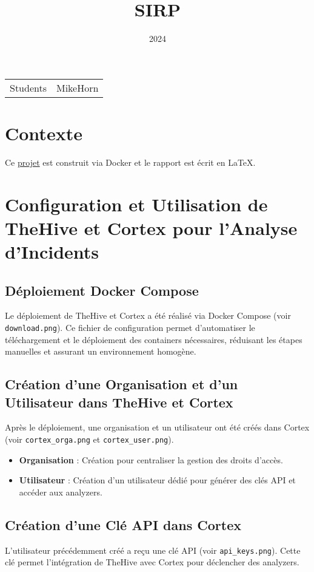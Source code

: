 \documentclass{article}
\title{SIRP}
\date{2024}
\begin{document}
\maketitle

\noindent\begin{tabular}{@{}ll}
    Students & MikeHorn
\end{tabular}

\section*{Contexte}
Ce \href{https://github.com/MikeHorn-git/SIRP}{projet} est construit via Docker et le rapport est écrit en LaTeX.

\section{Configuration et Utilisation de TheHive et Cortex pour l'Analyse d'Incidents}

\subsection{Déploiement Docker Compose}
Le déploiement de TheHive et Cortex a été réalisé via Docker Compose (voir \texttt{download.png}). Ce fichier de configuration permet d’automatiser le téléchargement et le déploiement des containers nécessaires, réduisant les étapes manuelles et assurant un environnement homogène.

\subsection{Création d’une Organisation et d’un Utilisateur dans TheHive et Cortex}
Après le déploiement, une organisation et un utilisateur ont été créés dans Cortex (voir \texttt{cortex\_orga.png} et \texttt{cortex\_user.png}).
\begin{itemize}
    \item \textbf{Organisation} : Création pour centraliser la gestion des droits d’accès.
    \item \textbf{Utilisateur} : Création d’un utilisateur dédié pour générer des clés API et accéder aux analyzers.
\end{itemize}

\subsection{Création d’une Clé API dans Cortex}
L’utilisateur précédemment créé a reçu une clé API (voir \texttt{api\_keys.png}). Cette clé permet l’intégration de TheHive avec Cortex pour déclencher des analyzers.
\end{document}

